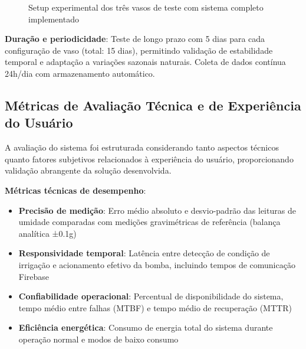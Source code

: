 \begin{figure}[htbp]
\centering
\caption{Setup experimental dos três vasos de teste com sistema completo implementado}
\label{fig:setup_experimental}
\end{figure}

\textbf{Duração e periodicidade}: Teste de longo prazo com 5 dias para cada configuração de vaso (total: 15 dias), permitindo validação de estabilidade temporal e adaptação a variações sazonais naturais. Coleta de dados contínua 24h/dia com armazenamento automático.

\subsection{Métricas de Avaliação Técnica e de Experiência do Usuário}

A avaliação do sistema foi estruturada considerando tanto aspectos técnicos quanto fatores subjetivos relacionados à experiência do usuário, proporcionando validação abrangente da solução desenvolvida.

\textbf{Métricas técnicas de desempenho}:
\begin{itemize}
\item \textbf{Precisão de medição}: Erro médio absoluto e desvio-padrão das leituras de umidade comparadas com medições gravimétricas de referência (balança analítica ±0.1g)
\item \textbf{Responsividade temporal}: Latência entre detecção de condição de irrigação e acionamento efetivo da bomba, incluindo tempos de comunicação Firebase
\item \textbf{Confiabilidade operacional}: Percentual de disponibilidade do sistema, tempo médio entre falhas (MTBF) e tempo médio de recuperação (MTTR)
\item \textbf{Eficiência energética}: Consumo de energia total do sistema durante operação normal e modos de baixo consumo
\end{itemize}

